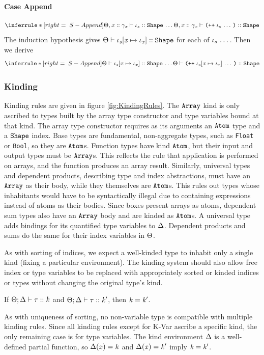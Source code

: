 \begin{sproof}
  \paragraph{Case {\sc Append}}
  \[\infr[S-Append]
  {\sequence{\sortof{\sEnv,\hassort{\var}{\sort_\var}}{\idx_s}{\sortshp}}}
  {\sortof{\sEnv,\hassort{\var}{\sort_\var}}{\idxappend{\sequence{\idx_s}}}{\sortshp}}\]
  The induction hypothesis gives
  $\Theta \vdash \mathit{\iota}_s\hspace{-2pt}\left[ \mathit{x} \mapsto \mathit{\iota}_{\mathit{x}} \right] :: \text{\tt Shape}$
  for each of $\mathit{\iota}_s \, \ldots \,$.
  Then we derive
  \[\infr[S-Append]
  {\sequence{\sortof{\sEnv}{\idxsubst{\idx_s}}{\sortshp}}}
  {\sortof{\sEnv}{\idxappend{\sequence{\idxsubst{\idx_s}}}}{\sortshp}}\]
\end{sproof}


\subsubsection{Kinding}
\FigKindingRules
Kinding rules are given in figure \ref{fig:KindingRules}.
The $\text{\tt Array}$ kind is only ascribed to
types built by the array type constructor
and type variables bound at that kind.
The array type constructor requires as its arguments
an $\text{\tt Atom}$ type and a $\text{\tt Shape}$ index.
Base types are fundamental, non-aggregate types,
such as {\tt Float} or {\tt Bool},
so they are $\text{\tt Atom}$s.
Function types have kind $\text{\tt Atom}$,
but their input and output types must be $\text{\tt Array}$s.
This reflects the rule that application is performed on arrays,
and the function produces an array result.
Similarly, universal types and dependent products,
describing type and index abstractions,
must have an $\text{\tt Array}$ as their body,
while they themselves are $\text{\tt Atom}$s.
This rules out types whose inhabitants would have to be syntactically illegal
due to containing expressions instead of atoms as their bodies.
Since boxes present arrays as atoms,
dependent sum types also have an $\text{\tt Array}$ body
and are kinded as $\text{\tt Atom}$s.
A universal type adds bindings for its quantified type variables to $\Delta$.
Dependent products and sums do the same for their index variables in $\Theta$.

As with sorting of indices,
we expect a well-kinded type to inhabit only a single kind (fixing a particular environment).
The kinding system should also allow free index or type variables to be
replaced with appropriately sorted or kinded indices or types
without changing the original type's kind.

\begin{lemma}
  \label{UniqKind}
  If $\Theta;\Delta \vdash \mathit{\tau} :: \mathit{k}$
  and $\Theta;\Delta \vdash \mathit{\tau} :: \mathit{k}'$,
  then $\mathit{k} = \mathit{k}'$.
\end{lemma}
\begin{sproof}[\BODY]
  As with uniqueness of sorting,
  no non-variable type is compatible with multiple kinding rules.
  Since all kinding rules except for {\sc K-Var}
  ascribe a specific kind,
  the only remaining case is for type variables.
  The kind environment $\Delta$ is a well-defined partial function,
  so $\Delta(\mathit{x}) = \mathit{k}$ and $\Delta(\mathit{x}) = \mathit{k}'$ imply $\mathit{k} = \mathit{k}'$.
\end{sproof}

